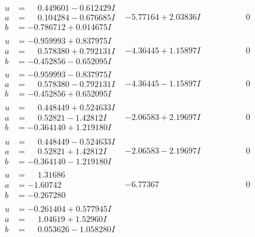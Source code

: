 \documentclass[1p]{elsarticle_modified}
\theoremstyle{definition}
\begin{document}
$$\begin{array}{c|c|c}
\begin{aligned}
u &= \phantom{-}0.449601 - 0.612429 I \\
a &= \phantom{-}0.104284 - 0.676685 I \\
b &= -0.786712 + 0.014675 I\end{aligned}
 & -5.77164 + 2.03836 I & \phantom{-0.000000 } 0 \\ \hline\begin{aligned}
u &= -0.959993 + 0.837975 I \\
a &= \phantom{-}0.578380 + 0.792131 I \\
b &= -0.452856 - 0.652095 I\end{aligned}
 & -4.36445 + 1.15897 I & \phantom{-0.000000 } 0 \\ \hline\begin{aligned}
u &= -0.959993 - 0.837975 I \\
a &= \phantom{-}0.578380 - 0.792131 I \\
b &= -0.452856 + 0.652095 I\end{aligned}
 & -4.36445 - 1.15897 I & \phantom{-0.000000 } 0 \\ \hline\begin{aligned}
u &= \phantom{-}0.448449 + 0.524633 I \\
a &= \phantom{-}0.52821 - 1.42812 I \\
b &= -0.364140 + 1.219180 I\end{aligned}
 & -2.06583 + 2.19697 I & \phantom{-0.000000 } 0 \\ \hline\begin{aligned}
u &= \phantom{-}0.448449 - 0.524633 I \\
a &= \phantom{-}0.52821 + 1.42812 I \\
b &= -0.364140 - 1.219180 I\end{aligned}
 & -2.06583 - 2.19697 I & \phantom{-0.000000 } 0 \\ \hline\begin{aligned}
u &= \phantom{-}1.31686\phantom{ +0.000000I} \\
a &= -1.60742\phantom{ +0.000000I} \\
b &= -0.267280\phantom{ +0.000000I}\end{aligned}
 & -6.77367\phantom{ +0.000000I} & \phantom{-0.000000 } 0 \\ \hline\begin{aligned}
u &= -0.261404 + 0.577945 I \\
a &= \phantom{-}1.04619 + 1.52960 I \\
b &= \phantom{-}0.053626 - 1.058280 I\end{aligned}

\end{array}$$
\end{document}
